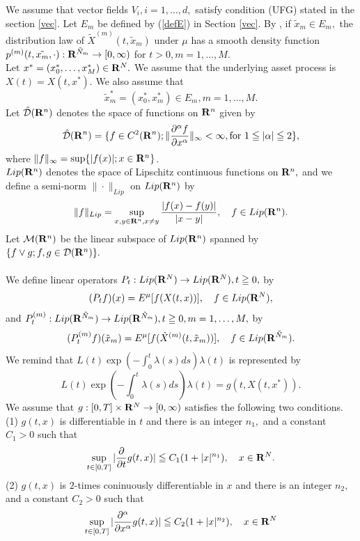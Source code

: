 \documentclass[12pt]{article}
\begin{document}
We assume that vector fields ${V}_i, i=1,\ldots,d,$ satisfy condition (UFG) stated in the section \ref{vec}. 
Let $E_m $ be defined by (\ref{defE}) in Section \ref{vec}. By \cite{KM}, if $\tilde{x}_m \in E_m,$ 
the distribution law of $\tilde{X}^{(m)}(t,\tilde{x}_m)$ under $\mu$ has a smooth density function
$p^{(m)}(t,\tilde{x_m},\cdot ):{\bf R}^{\tilde{N}_m}\to [0,\infty )$ for $t>0, m=1, \ldots, M.$\\
Let $x^{*} =(x_0^*, \ldots, x_M^*) \in {\bf R}^N.$ We assume that the underlying asset process is $X(t)=X(t, x^*)$.
We also assume that
$$\tilde{x}^*_m=(x_0^*, x_m^*) \in E_m, m=1,\ldots, M.$$
Let $\hat{{\cal D}}({\bf R}^n)$ denotes the space of functions on ${\bf R}^n$ given by
 $$\hat{{\cal D}}({\bf R}^n) =\{ f \in C^2({\bf R}^n); \|\frac{\partial^{\alpha}f}{\partial x^{\alpha}}\|_{\infty} <\infty, \text{for  } 1 \leqq |\alpha| \leqq 2 \},$$
 where $\|f\|_{\infty}=\sup \{|f(x)|; x\in {\bf R}^n\}$.\\
${Lip}({\bf R}^n)$ denotes the space of Lipschitz continuous functions on ${\bf R}^n,$  and
we define a semi-norm $\|\cdot \|_{Lip}$ on $Lip({\bf R}^n)$ by
$$\|f\|_{{Lip}}=\sup_{x,y\in {\bf R}^n, x \neq y} \frac{|f(x)-f(y)|}{|x-y|},
\quad f\in {Lip}({\bf R}^n).$$
Let ${\cal M}({\bf R}^n)$ be the linear subspace of ${Lip}({\bf R}^n)$  spanned by
$\{f \vee g;  f, g \in {\cal D}({\bf R}^n)\}.$\\
\\
We define linear operators 
$P_{t}:{Lip}({\bf R}^N) \to {Lip}({\bf R}^N), t \geqq 0,$ by
$$
(P_{t}f)(x) = E^{\mu}[f(X(t,x))], \quad f\in {Lip}({\bf R}^N),
$$
and $P^{(m)}_{t}:{Lip}({\bf R}^{\tilde{N}_m}) \to {Lip}({\bf R}^{\tilde{N}_m}), t \geqq 0 , m=1, \ldots,M,$ by
$$
(P^{(m)}_{t}f)(\tilde{x}_m) = E^{\mu}[f(\tilde{X}^{(m)}(t,\tilde{x}_m))], \quad f \in {Lip}({\bf R}^{\tilde{N}_m}).
$$
We remind that $L(t)\exp(-\int_0^t\lambda(s)ds)\lambda(t) $ is represented by
$$
L(t)\exp(-\int_0^t\lambda(s)ds)\lambda(t) = g(t, X(t,x^*)).
$$
We assume that $g: [0,T] \times {\bf R}^N \to [0,\infty)$ satisfies the following two conditions.\\
(1) $g(t,x)$ is differentiable in $t$ and there is an integer $n_1,$ and a constant $C_1 >0$ such that
$$\sup_{t\in[0,T]}| \frac{\partial}{\partial t}g(t,x)|  \leqq C_1(1+|x|^{n_1})
,\quad x \in {\bf R}^N.$$
(2) $g(t,x)$ is $2$-times coninuously differentiable in $x$ and there is an integer $n_2,$ and a constant $C_2 >0$ such that
$$
\sup_{t\in[0,T]} |\frac{\partial^{\alpha}}{\partial x^{\alpha}}g(t,x)| \leqq C_2(1+|x|^{n_2}),\quad x \in {\bf R}^N
$$
\end{document}
